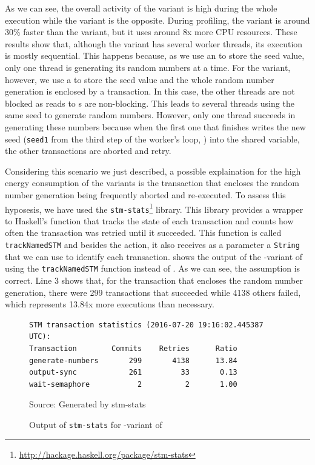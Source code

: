 As we can see, the overall activity of the \TVar variant is high during the whole execution while the \MVar variant is the opposite. During profiling, the \TVar variant is around 30\% faster than the \MVar variant, but it uses around 8x more CPU resources. These results show that, although the \MVar variant has several worker threads, its execution is mostly sequential. This happens because, as we use an \MVar to store the seed value, only one thread is generating its random numbers at a time. For the \TVar variant, however, we use a \TVar to store the seed value and the whole random number generation is enclosed by a transaction. In this case, the other threads are not blocked as reads to {\TVar}s are non-blocking. This leads to several threads using the same seed to generate random numbers. However, only one thread succeeds in generating these numbers because when the first one that finishes writes the new seed (\texttt{seed1} from the third step of the worker's loop, ) into the shared variable, the other transactions are aborted and retry.

Considering this scenario we just described, a possible explaination for the high energy consumption of the \TVar variants is the transaction that encloses the random number generation being frequently aborted and re-executed. To assess this hyposesis, we have used the \texttt{stm-stats}\footnote{\url{http://hackage.haskell.org/package/stm-stats}} library. This library provides a wrapper to Haskell's \atomically function that tracks the state of each transaction and counts how often the transaction was retried until it succeeded. This function is called \texttt{trackNamedSTM} and besides the \STM action, it also receives as a parameter a \texttt{String} that we can use to identify each transaction.  shows the output of the \forkIO-\TVar variant of \fasta using the \texttt{trackNamedSTM} function instead of \atomically. As we can see, the assumption is correct. Line 3 shows that, for the transaction that encloses the random number generation, there were 299 transactions that succeeded while 4138 others failed, which represents 13.84x more executions than necessary.

\begin{figure}[htp]
  \centering
  \caption{Output of \texttt{stm-stats} for \forkIO-\TVar variant of \fasta}
	\begin{verbatim}
STM transaction statistics (2016-07-20 19:16:02.445387 UTC):
Transaction        Commits    Retries      Ratio
generate-numbers       299       4138      13.84
output-sync            261         33       0.13
wait-semaphore           2          2       1.00
  \end{verbatim}
  \footnotesize{Source: Generated by stm-stats}
  \label{fig:fasta-stm-stats}
\end{figure}

